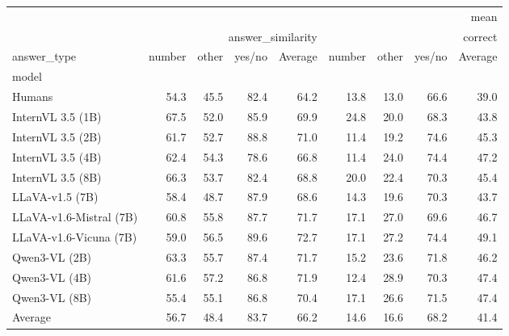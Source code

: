 \begin{tabular}{lrrrrrrrr}
\toprule
 & \multicolumn{8}{r}{mean} \\
 & \multicolumn{4}{r}{answer_similarity} & \multicolumn{4}{r}{correct} \\
answer_type & number & other & yes/no & Average & number & other & yes/no & Average \\
model &  &  &  &  &  &  &  &  \\
\midrule
Humans & 54.3 & 45.5 & 82.4 & 64.2 & 13.8 & 13.0 & 66.6 & 39.0 \\
InternVL 3.5 (1B) & 67.5 & 52.0 & 85.9 & 69.9 & 24.8 & 20.0 & 68.3 & 43.8 \\
InternVL 3.5 (2B) & 61.7 & 52.7 & 88.8 & 71.0 & 11.4 & 19.2 & 74.6 & 45.3 \\
InternVL 3.5 (4B) & 62.4 & 54.3 & 78.6 & 66.8 & 11.4 & 24.0 & 74.4 & 47.2 \\
InternVL 3.5 (8B) & 66.3 & 53.7 & 82.4 & 68.8 & 20.0 & 22.4 & 70.3 & 45.4 \\
LLaVA-v1.5 (7B) & 58.4 & 48.7 & 87.9 & 68.6 & 14.3 & 19.6 & 70.3 & 43.7 \\
LLaVA-v1.6-Mistral (7B) & 60.8 & 55.8 & 87.7 & 71.7 & 17.1 & 27.0 & 69.6 & 46.7 \\
LLaVA-v1.6-Vicuna (7B) & 59.0 & 56.5 & 89.6 & 72.7 & 17.1 & 27.2 & 74.4 & 49.1 \\
Qwen3-VL (2B) & 63.3 & 55.7 & 87.4 & 71.7 & 15.2 & 23.6 & 71.8 & 46.2 \\
Qwen3-VL (4B) & 61.6 & 57.2 & 86.8 & 71.9 & 12.4 & 28.9 & 70.3 & 47.4 \\
Qwen3-VL (8B) & 55.4 & 55.1 & 86.8 & 70.4 & 17.1 & 26.6 & 71.5 & 47.4 \\
Average & 56.7 & 48.4 & 83.7 & 66.2 & 14.6 & 16.6 & 68.2 & 41.4 \\
\bottomrule
\end{tabular}
